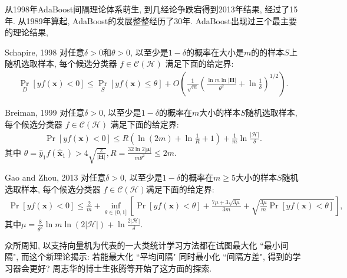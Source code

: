 从1998年AdaBoost间隔理论体系萌生, 到几经论争跌宕得到2013年结果, 经过了15年.
从1989年算起, AdaBoost的发展整整经历了30年.
AdaBoost出现过三个最主要的理论结果,
\begin{mythm}{Schapire, 1998 \cite{Schapire1998}}{}\label{AIthm7.1}
    对任意$\delta>0$和$\theta>0$, 以至少是$1-\delta$的概率在大小是$m$的的样本$S$上随机选取样本, 每个候选分类器 $f \in \mathcal{C} (\mathcal{H})$ 满足下面的给定界:
\begin{align}
    \operatorname{Pr}_{D}[y f (\boldsymbol{x})<0] \leq \operatorname{Pr}_{S}[y f (\boldsymbol{x}) \leq \theta]+O\left (\frac{1}{\sqrt{m}}\left (\frac{\ln m \ln |\boldsymbol{H}|}{\theta^{2}}+\ln \frac{1}{\delta}\right)^{1 / 2}\right).
\end{align}
\end{mythm}
\begin{mythm}{Breiman, 1999\cite{Breiman1999}}{}\label{AIthm7.2}
    对任意$\delta>0$, 以至少是$1-\delta$的概率在$m$大小的样本$S$随机选取样本, 每个候选分类器 $f\in \mathcal{C} (\mathcal{H})$ 满足下面的给定界:
\begin{align}
    \operatorname{Pr}[y f (\boldsymbol{x})<0] \leq R\left (\ln (2 m)+\ln \frac{1}{R}+1\right)+\frac{1}{m} \ln \frac{|\mathcal{H}|}{\delta}.
\end{align}
其中 $\theta=\hat{y}_{1} f\left (\hat{\boldsymbol{x}}_{1}\right)>4 \sqrt{\frac{2}{|\boldsymbol{H}|}}, R=\frac{32 \ln 2|\boldsymbol{\mu}|}{m \theta^{2}} \leq 2 m$.
\end{mythm}
\begin{mythm}{Gao and Zhou, 2013 \cite{ZhouDBLP}}{}\label{AIthm7.3}
    对任意$\delta>0$, 以至少是$1-\delta$的概率在$m \geq 5$大小的样本$S$随机选取样本, 每个候选分类器 $f \in \mathcal{C} (\mathcal{H})$满足下面的给定界:
\begin{align}
    \operatorname{Pr}[y f (\boldsymbol{x})<0] \leq \frac{2}{m}+\inf _{\theta \in (0,1]}\left[\operatorname{Pr}[y f (\boldsymbol{x})<\theta]+\frac{7 \mu+3 \sqrt{3 \mu}}{3 m}+\sqrt{\frac{3 \mu}{m} \operatorname{Pr}[y f (\boldsymbol{x})<\theta]}\right],
\end{align}
其中$\mu=\frac{8}{\theta^{2}} \ln m \ln (2|\mathcal{H}|)+\ln \frac{2|\mathcal{H}|}{\delta}$.
\end{mythm}

众所周知, 以支持向量机为代表的一大类统计学习方法都在试图最大化 ``最小间隔", 而这个新理论揭示: 若能最大化 ``平均间隔" 同时最小化 ``间隔方差", 得到的学习器会更好?
周志华的博士生张腾等开始了这方面的探索.

